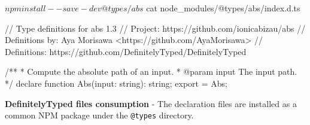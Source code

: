 \begin{code}
	\begin{bashinline}
$ npm install --save-dev @types/abs 
$ cat node_modules/@types/abs/index.d.ts

// Type definitions for abs 1.3
// Project: https://github.com/ionicabizau/abs
// Definitions by: Aya Morisawa <https://github.com/AyaMorisawa>
// Definitions: https://github.com/DefinitelyTyped/DefinitelyTyped

/**
 * Compute the absolute path of an input.
 * @param input The input path.
 */
declare function Abs(input: string): string;
export = Abs;
	  \end{bashinline}
	\caption[DefinitelyTyped files consumption]{\textbf{DefinitelyTyped files consumption} - The declaration files are installed as a common NPM package under the \texttt{@types} directory.}
	\label{code:background-definitely-typed-consumption}
  \end{code}

